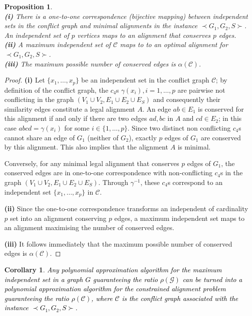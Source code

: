 \documentclass[final]{dmtcs-episciences}
\newtheorem{corollary}[theorem]{Corollary}
\newtheorem{proposition}[theorem]{Proposition}
\newcommand\mar[1]{\textcolor{black}{#1}}
\begin{document}
\begin{proposition}\label{prop:reduction_alpha}\mbox{}\\
{\bf{(i)}} There is a one-to-one correspondence (bijective mapping) between independent sets in the conflict graph and minimal alignments in the instance $\prec G_1,G_2,S \succ$. An independent set of $p$ vertices maps to an alignment that conserves $p$ edges.\\
  {\bf{(ii)}} A maximum independent set of $\mathcal{C}$ maps to to an optimal alignment for $\prec G_1,G_2,S \succ$.\\
   {\bf{(iii)}} The maximum possible number of conserved edges is $\alpha(\mathcal{C})$.
\end{proposition}
\begin{proof}
\textbf{(i)}
 Let $\{x_1, \ldots, x_p\}$ be an independent  set in the conflict graph $\mathcal{C}$; by definition of the conflict graph, the $c_4$s $\gamma(x_i), i=1, \ldots, p$ are pairwise not conflicting in the graph $(V_1\cup V_2, E_1\cup E_2\cup E_S)$ and consequently their similarity edges constitute a legal alignment $A$. An edge $ab\in E_1$ is conserved for this alignment if and only if there are two edges $ad, bc$ in $A$ and $cd\in E_2$; in this case $abcd=\gamma(x_i)$ for some $i\in\{1, \ldots, p\}$.  Since two distinct non conflicting $c_4$s cannot share an edge of $G_1$ (neither of $G_2$), exactly $p$ edges of $G_1$ are conserved by this alignment. This also implies that the alignment $A$ is minimal.
 
 Conversely, for any minimal legal alignment that conserves $p$ edges of $G_1$, the conserved edges are in one-to-one correspondence with non-conflicting $c_4$s in the graph $(V_1\cup V_2, E_1\cup E_2\cup E_S)$. Through $\gamma^{-1}$, these $c_4$s correspond to an independent set $\{x_1, \ldots, x_p\}$ in $\mathcal{C}$.
 
 \textbf{(ii)} Since the one-to-one correspondence transforms an independent of cardinality $p$ set into  an alignment conserving $p$ edges, a maximum independent set maps to an alignment maximising the number of conserved edges.
 
 
 \textbf{(iii)} It follows immediately that the maximum possible number of conserved edges is $\alpha(\mathcal{C})$.
 
\end{proof}



\begin{corollary}\label{cor:reduction}
\mar{Any polynomial approximation algorithm for the maximum independent set in a graph $G$  guaranteeing the ratio $\rho(\mathcal{G})$  can be turned into a  polynomial approximation algorithm for the constrained alignment problem guaranteeing the ratio $\rho(\mathcal{\mathcal{C}})$, where $\mathcal{C}$ is the conflict graph associated with the instance $\prec G_1,G_2,S \succ$.}
\end{corollary}
\end{document}
